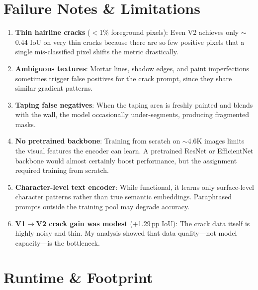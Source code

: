\documentclass[12pt,a4paper]{article}
\begin{document}
\section{Failure Notes \& Limitations}

\begin{enumerate}[nosep]
  \item \textbf{Thin hairline cracks} ($<$1\% foreground pixels): Even V2 achieves only $\sim$0.44 IoU on very thin cracks because there are so few positive pixels that a single mis-classified pixel shifts the metric drastically.

  \item \textbf{Ambiguous textures}: Mortar lines, shadow edges, and paint imperfections sometimes trigger false positives for the crack prompt, since they share similar gradient patterns.

  \item \textbf{Taping false negatives}: When the taping area is freshly painted and blends with the wall, the model occasionally under-segments, producing fragmented masks.

  \item \textbf{No pretrained backbone}: Training from scratch on $\sim$4.6K images limits the visual features the encoder can learn.  A pretrained ResNet or EfficientNet backbone would almost certainly boost performance, but the assignment required training from scratch.

  \item \textbf{Character-level text encoder}: While functional, it learns only surface-level character patterns rather than true semantic embeddings.  Paraphrased prompts outside the training pool may degrade accuracy.

  \item \textbf{V1$\to$V2 crack gain was modest} (+1.29\,pp IoU): The crack data itself is highly noisy and thin.  My analysis showed that data quality---not model capacity---is the bottleneck.
\end{enumerate}

\section{Runtime \& Footprint}
\end{document}
